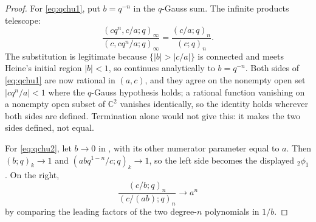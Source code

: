 \documentclass[11pt,oneside,openany]{book}
\theoremstyle{definition}
\theoremstyle{remark}
\newcommand{\C}{\mathbb C}
\newcommand{\abs}[1]{\lvert #1\rvert}
\begin{document}
\begin{proof}
For \eqref{eq:qchu1}, put $b=q^{-n}$ in the $q$-Gauss sum.  The infinite products telescope:
\[
 \frac{(cq^n,c/a;q)_\infty}{(c,cq^n/a;q)_\infty}
 =\frac{(c/a;q)_n}{(c;q)_n}.
\]
The substitution is legitimate because $\{\abs b>\abs{c/a}\}$ is connected and
meets Heine's initial region $\abs b<1$, so  continues
analytically to $b=q^{-n}$.  Both sides of \eqref{eq:qchu1} are now rational
in $(a,c)$, and they agree on the nonempty open set $\abs{cq^n/a}<1$ where the
$q$-Gauss hypothesis holds; a rational function vanishing on a nonempty open
subset of $\C^2$ vanishes identically, so the identity holds wherever both
sides are defined.  Termination alone would not give this: it makes the two
sides defined, not equal.

For \eqref{eq:qchu2}, let $b\to0$ in , with its other numerator parameter equal to $a$.  Then $(b;q)_k\to1$ and $(abq^{1-n}/c;q)_k\to1$, so the left side becomes the displayed ${}_2\phi_1$.  On the right,
\[
 \frac{(c/b;q)_n}{(c/(ab);q)_n}\longrightarrow a^n
\]
by comparing the leading factors of the two degree-$n$ polynomials in $1/b$.
\end{proof}

\end{document}
